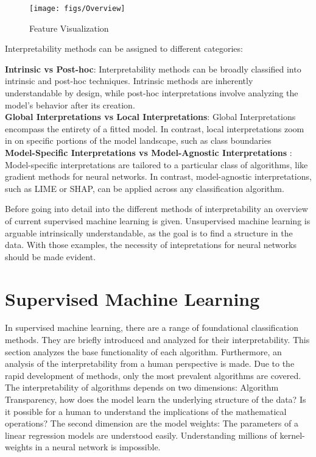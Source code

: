 \begin{figure}[h!]
	\centering
	\texttt{[image: figs/Overview]}
	\caption{Feature Visualization \cite{allen2023interpretable}}
	\label{fig:IML_Overview}
\end{figure}

Interpretability methods can be assigned to different categories:

\textbf{Intrinsic vs Post-hoc}: Interpretability methods can be broadly classified into intrinsic and post-hoc techniques. Intrinsic methods are inherently understandable by design, while post-hoc interpretations involve analyzing the model's behavior after its creation.
\\
\textbf{Global Interpretations vs Local Interpretations}\cite{molnar2022}: Global Interpretations encompass the entirety of a fitted model. In contrast, local interpretations zoom in on specific portions of the model landscape, such as class boundaries
\\
\textbf{Model-Specific Interpretations vs Model-Agnostic Interpretations} \cite{molnar2022}: 
Model-specific interpretations are tailored to a particular class of algorithms, like gradient methods for neural networks. In contrast, model-agnostic interpretations, such as LIME or SHAP, can be applied across any classification algorithm.


Before going into detail into the different methods of interpretability an overview of current supervised machine learning is given. Unsupervised machine learning is arguable intrinsically understandable, as the goal is to find a structure in the data. \cite{allen2023interpretable} With those examples, the necessity of intepretations for neural networks should be made evident.

\section{Supervised Machine Learning}

In supervised machine learning, there are a range of foundational classification methods. They are briefly introduced and analyzed for their interpretability. This section analyzes the base functionality of each algorithm. Furthermore, an analysis of the interpretability from a human perspective is made. Due to the rapid development of methods, only the most prevalent algorithms are covered.
\\
The interpretability of algorithms depends on two dimensions: Algorithm Transparency, how does the model learn the underlying structure of the data? Is it possible for a human to understand the implications of the mathematical operations? \cite{molnar2022} The second dimension are the model weights: The parameters of a linear regression models are understood easily. Understanding millions of kernel-weights in a neural network is impossible.

